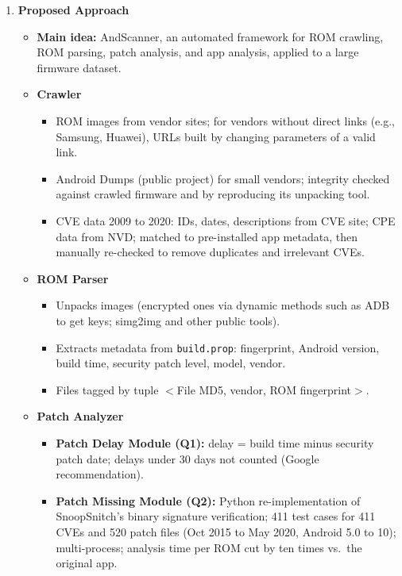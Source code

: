 \documentclass[11pt,a4paper]{article}
\newcommand{\entrypart}[1]{\textbf{\color{accent}#1}\par\vspace{2pt}}
\begin{document}
\begin{enumerate}
    \item \entrypart{Proposed Approach}

    \begin{itemize}[leftmargin=*,itemsep=1pt,topsep=2pt]
        \item \textbf{Main idea:} AndScanner, an automated framework for ROM crawling, ROM parsing, patch analysis, and app analysis, applied to a large firmware dataset.
        \item \textbf{Crawler}
        \begin{itemize}[itemsep=0pt]
            \item ROM images from vendor sites; for vendors without direct links (e.g., Samsung, Huawei), URLs built by changing parameters of a valid link.
            \item Android Dumps (public project) for small vendors; integrity checked against crawled firmware and by reproducing its unpacking tool.
            \item CVE data 2009 to 2020: IDs, dates, descriptions from CVE site; CPE data from NVD; matched to pre-installed app metadata, then manually re-checked to remove duplicates and irrelevant CVEs.
        \end{itemize}
        \item \textbf{ROM Parser}
        \begin{itemize}[itemsep=0pt]
            \item Unpacks images (encrypted ones via dynamic methods such as ADB to get keys; simg2img and other public tools).
            \item Extracts metadata from \texttt{build.prop}: fingerprint, Android version, build time, security patch level, model, vendor.
            \item Files tagged by tuple $<$File MD5, vendor, ROM fingerprint$>$.
        \end{itemize}
        \item \textbf{Patch Analyzer}
        \begin{itemize}[itemsep=0pt]
            \item \textbf{Patch Delay Module (Q1):} delay = build time minus security patch date; delays under 30 days not counted (Google recommendation).
            \item \textbf{Patch Missing Module (Q2):} Python re-implementation of SnoopSnitch's binary signature verification; 411 test cases for 411 CVEs and 520 patch files (Oct 2015 to May 2020, Android 5.0 to 10); multi-process; analysis time per ROM cut by ten times vs.\ the original app.

\end{itemize}
\end{itemize}
\end{enumerate}
\end{document}
